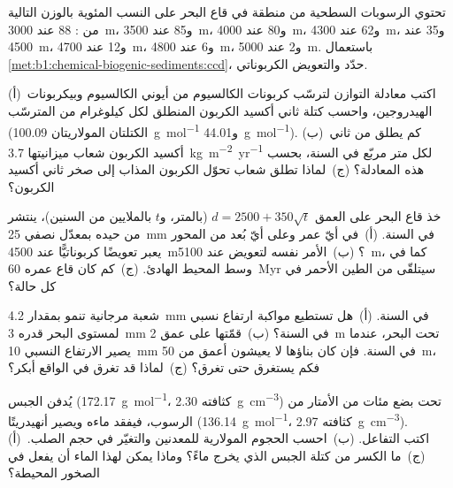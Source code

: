 \begin{exercise}[$\star$]\label{exo:b1:chemical-biogenic-sediments:4}
تحتوي الرسوبات السطحية من منطقة في قاع البحر على النسب المئوية بالوزن التالية من : 88 عند \qty{3000}{m}، و\num{85} عند \qty{3500}{m}، و\num{80} عند \qty{4000}{m}، و\num{62} عند \qty{4300}{m}، و\num{35} عند \qty{4500}{m}، و\num{12} عند \qty{4700}{m}، و\num{6} عند \qty{4800}{m}، و\num{2} عند \qty{5000}{m}. باستعمال \cref{met:b1:chemical-biogenic-sediments:ccd}، حدّد  والتعويض الكربوناتي.
\end{exercise}

\begin{exercise}[$\star\star$]\label{exo:b1:chemical-biogenic-sediments:5}
(أ)~اكتب معادلة التوازن لترسّب كربونات الكالسيوم من أيوني الكالسيوم وبيكربونات الهيدروجين، واحسب كتلة ثاني أكسيد الكربون المنطلق لكل كيلوغرام من  المترسّب (الكتلتان المولاريتان \qty{100.09}{g.mol^{-1}} و\qty{44.01}{g.mol^{-1}}). (ب)~كم يطلق من ثاني أكسيد الكربون شعاب ميزانيتها \qty{3.7}{kg.m^{-2}.yr^{-1}} لكل متر مربّع في السنة، بحسب هذه المعادلة؟ (ج)~لماذا تطلق شعاب تحوّل الكربون المذاب إلى صخر ثاني أكسيد الكربون؟
\end{exercise}

\begin{exercise}[$\star\star$]\label{exo:b1:chemical-biogenic-sediments:6}
خذ قاع البحر على العمق $d = 2500 + 350\sqrt t$ (بالمتر، و$t$ بالملايين من السنين)، ينتشر من حيده بمعدّل نصفي \qty{25}{mm} في السنة. (أ)~في أيّ عمر وعلى أيّ بُعد من المحور يعبر تعويضًا كربوناتيًّا عند \qty{4500}{m}؟ (ب)~الأمر نفسه لتعويض عند \qty{5100}{m}، كما في وسط المحيط الهادئ. (ج)~كم كان قاع عمره \qty{60}{Myr} سيتلقّى من الطين الأحمر في كل حالة؟
\end{exercise}

\begin{exercise}[$\star\star$]\label{exo:b1:chemical-biogenic-sediments:7}
شعبة مرجانية تنمو بمقدار \qty{4.2}{mm} في السنة. (أ)~هل تستطيع مواكبة ارتفاع نسبي لمستوى البحر قدره \qty{3}{mm} في السنة؟ (ب)~قمّتها على عمق \qty{2}{m} تحت البحر، عندما يصير الارتفاع النسبي \qty{10}{mm} في السنة. فإن كان بناؤها لا يعيشون أعمق من \qty{50}{m}، فكم يستغرق حتى تغرق؟ (ج)~لماذا قد تغرق في الواقع أبكر؟
\end{exercise}

\begin{exercise}[$\star\star$]\label{exo:b1:chemical-biogenic-sediments:8}
يُدفن الجبس  (\qty{172.17}{g.mol^{-1}}، كثافته \qty{2.30}{g.cm^{-3}}) تحت بضع مئات من الأمتار من الرسوب، فيفقد ماءه ويصير أنهيدريتًا  (\qty{136.14}{g.mol^{-1}}، كثافته \qty{2.97}{g.cm^{-3}}). (أ)~اكتب التفاعل. (ب)~احسب الحجوم المولارية للمعدنين والتغيّر في حجم الصلب. (ج)~ما الكسر من كتلة الجبس الذي يخرج ماءً؟ وماذا يمكن لهذا الماء أن يفعل في الصخور المحيطة؟
\end{exercise}

